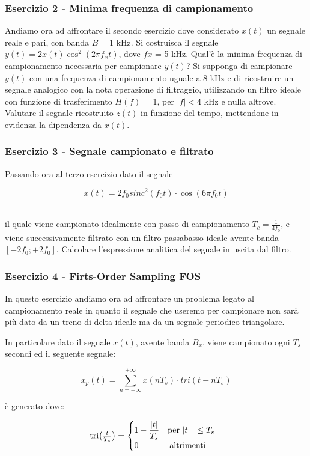 \documentclass[../main.tex]{subfiles}
\begin{document}
 
\subsubsection{Esercizio 2 - Minima frequenza di campionamento}

Andiamo ora ad affrontare il secondo esercizio dove considerato $x(t)$ un segnale reale e pari, con banda $ B =1 $ kHz. Si costruisca il segnale $y(t) = 2x(t) \cos^2(2 \pi f_x t)$, dove $fx$ = 5 kHz. Qual'è la minima frequenza di campionamento necessaria per campionare $y(t)$? Si supponga di campionare $y(t)$ con una frequenza di campionamento uguale a 8 kHz e di ricostruire un segnale analogico con la nota operazione di filtraggio, utilizzando un filtro ideale con funzione di trasferimento $H(f)$ = 1,  per $|f| < 4$ kHz e nulla altrove. Valutare il segnale ricostruito $z(t)$ in funzione del tempo, mettendone in evidenza la dipendenza da $x(t)$.

\subsubsection{Esercizio 3 - Segnale campionato e filtrato}

Passando ora al terzo esercizio dato il segnale 

\[x(t) = 2f_0\unit{sinc}^2(f_0t) \cdot \cos(6\pi f_0 t) \]\

il quale viene campionato idealmente con passo di campionamento $T_c = \frac{1}{4f_0}$, e viene successivamente filtrato con un filtro passabasso ideale avente banda $[-2f_0; +2f_0]$. Calcolare l’espressione analitica del segnale in uscita dal filtro.

\subsubsection{Esercizio 4 - Firts-Order Sampling FOS}

In questo esercizio andiamo ora ad affrontare un problema legato al campionamento reale in quanto il segnale che useremo per campionare non sarà più dato da un treno di delta ideale ma da un segnale periodico triangolare.

In particolare dato il segnale $x(t)$, avente banda $B_x$, viene campionato ogni $T_s$ secondi ed il seguente segnale:

\[ x_p(t) = \sum_{n = -\infty}^{+ \infty} x(nT_s)\cdot \unit{tri}(t - nT_s ) \]

è generato dove:

\[ \unit{tri}\big(\tfrac{t}{T_s}\big) =  \begin{cases}

1 - \dfrac{|t|}{T_s} \hspace{10pt} $per $ |t|\;\;\leq T_s\\
0 \hspace{37pt} $altrimenti$\\
	
\end{cases} \]\
\end{document}
